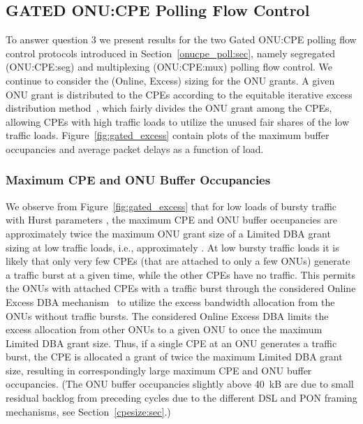 \documentclass[pdftex,journal]{IEEEtran}
\begin{document}
\subsection{GATED ONU:CPE Polling Flow Control}
To answer question 3 we present results for the two Gated ONU:CPE
polling flow control protocols introduced in
Section~\ref{onucpe_poll:sec}, namely segregated (ONU:CPE:seg) and
multiplexing (ONU:CPE:mux) polling flow control. We continue to
consider the (Online, Excess) sizing for the ONU grants. A given ONU
grant is distributed to the CPEs according to the equitable
iterative excess distribution method~\cite{AYDA1103,bai2006fair},
which fairly divides the ONU grant among the CPEs, allowing CPEs
with high traffic loads to utilize the unused fair shares of the low
traffic loads.
Figure~\ref{fig:gated_excess} contain plots of the maximum buffer occupancies
and average packet delays as a function of load.

\subsubsection{Maximum CPE and ONU Buffer Occupancies}
We observe from Figure~\ref{fig:gated_excess}
that for low loads of bursty traffic with Hurst parameters ,
the maximum CPE and ONU buffer occupancies are approximately twice
the maximum ONU grant size of a Limited DBA grant
sizing at low traffic loads, i.e., approximately
.
At low bursty traffic loads it is likely that only very few CPEs
(that are attached to only a few ONUs)
generate a traffic burst at a given time, while the other CPEs have no
traffic.
This permits the ONUs with attached CPEs with a traffic burst
through the considered Online
Excess DBA mechanism~\cite{AYDA1103,bai2006fair,MerMcM13}
to utilize the excess bandwidth allocation from the ONUs without
traffic bursts. The considered Online Excess DBA limits
the excess allocation from other ONUs to a given ONU to once the
maximum Limited DBA grant size.
Thus, if a single CPE at an ONU generates a traffic burst,
the CPE is allocated a grant of twice the maximum Limited DBA grant size,
resulting in correspondingly large maximum CPE and ONU buffer occupancies.
(The ONU buffer occupancies slightly above 40~kB are due to small
residual backlog from preceding cycles due to the
different DSL and PON framing mechanisms, see Section~\ref{cpesize:sec}.)
\end{document}
